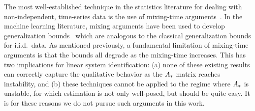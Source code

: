 The most well-established technique in the statistics literature for dealing
with non-independent, time-series data is the use of mixing-time arguments~\citep{yu94}.
In the machine learning literature, mixing arguments have been used to develop
generalization bounds~\citep{mohri07,mohri08,kuznetsov17,mcdonald17b} which
are analogous to the classical generalization bounds for i.i.d.\ data.
As mentioned previously, a fundamental limitation of mixing-time arguments is that
the bounds all degrade as the mixing-time increases. This has two implications for
linear system identification: (a) none of these existing results can correctly capture
the qualitative behavior as the $A_{*}$ matrix reaches instability, and (b)
these techniques cannot be applied to the regime where $A_{*}$ is unstable, for which
estimation is not only well-posed, but should be quite easy.
It is for these reasons we do not pursue such arguments in this work.




%
%
%
%

